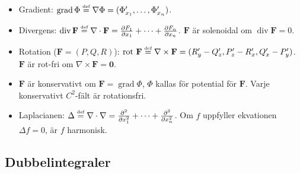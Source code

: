 \documentclass{article}
\newcommand\dd[2]{\frac{\partial #1}{\partial #2}}
\newcommand\bdF{\mathbf F}
\newcommand\bdzero{\mathbf 0}
\def\Rone{{\mathbb R}}
\def\Grad{\mathop{\mathrm{grad}}}
\def\Rot{\mathop{\mathrm{rot}}}
\newcommand\Div{\mathop{\mathrm{div}}}
\begin{document}
\begin{itemize}

   \item Gradient: %
     $\Grad \Phi \stackrel{\mbox{\tiny def}}
     {=} \nabla\Phi = (\Phi'_{x_1},\ldots,\Phi'_{x_n})$.
   \item %
        {Divergens:}
     $\Div \bdF \stackrel{\mbox{\tiny def}}
     {=} \nabla\cdot\bdF = \textstyle\dd{F_1}{x_1}+\cdots+\dd{F_n}{x_n}$.
        $\bdF$ 
           {är solenoidal om}
    $\Div \bdF=0$.
   \item %
     \Tr{Curl (in $\Rone^3$, $\bdF=(P,Q,R)$):}
        {Rotation ($\bdF=(P,Q,R)$):}
     $\Rot\,\bdF \stackrel{\mbox{\tiny def}}
        {=} \nabla\times\bdF = (R'_y-Q'_z,P'_z-R'_x,Q'_x-P'_y)$.
        $\bdF$
           {är rot-fri om}
        $\nabla\times\bdF=\bdzero$.
   \item %
   $\bdF$
      {är konservativt om}
   $\bdF=\Grad\Phi$, $\Phi$
      {kallas för potential för}
   $\bdF$.
      {Varje konservativt $C^2$-fält är rotationsfri}.
   \item %
        {Laplacianen:}
 $\Delta\stackrel{\mbox{\tiny def}}
 =\nabla\cdot\nabla=\dd {{}^2}{x_1^2}+\cdots+\dd {{}^2}{x_n^2}$.
    {Om}
 $f$
    {uppfyller ekvationen}
 $\Delta f=0$, 
    {är}
 $f$
    {harmonisk.}

\end{itemize}

\subsection*{
   {Dubbelintegraler}
}
\end{document}
